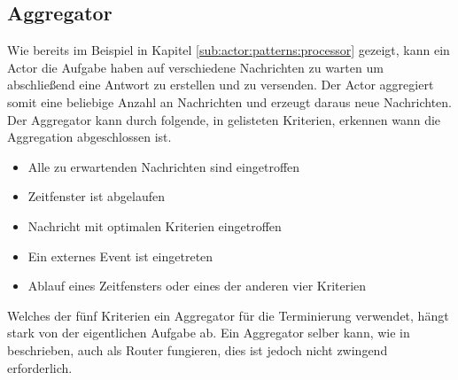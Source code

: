 \subsection{Aggregator}\label{sec:actor:patterns:aggregator}
Wie bereits im Beispiel in Kapitel \ref{sub:actor:patterns:processor} gezeigt, kann ein Actor die Aufgabe haben auf verschiedene Nachrichten zu warten um abschließend eine Antwort zu erstellen und zu versenden. Der Actor aggregiert somit eine beliebige Anzahl an Nachrichten und erzeugt daraus neue Nachrichten. \\
Der Aggregator kann durch folgende, in \cite{Vernon2015ReactiveAkka} gelisteten Kriterien, erkennen wann die Aggregation abgeschlossen ist.
\begin{itemize}
    \item Alle zu erwartenden Nachrichten sind eingetroffen
    \item Zeitfenster ist abgelaufen
    \item Nachricht mit optimalen Kriterien eingetroffen
    \item Ein externes Event ist eingetreten
    \item Ablauf eines Zeitfensters oder eines der anderen vier Kriterien
%
%
\end{itemize}
Welches der fünf Kriterien ein Aggregator für die Terminierung verwendet, hängt stark von der eigentlichen Aufgabe ab. Ein Aggregator selber kann, wie in \cite{Vernon2015ReactiveAkka} beschrieben, auch als Router fungieren, dies ist jedoch nicht zwingend erforderlich.


